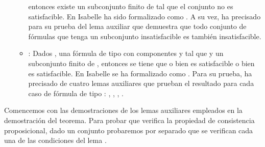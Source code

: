 \begin{isabellebody}
\begin{isamarkuptext}
\begin{itemize}
\begin{itemize}
      entonces existe un subconjunto finito  de  tal que el conjunto  no es 
      satisfacible. En Isabelle ha sido formalizado como . A su vez, ha precisado
      para su prueba del lema auxiliar  que demuestra que todo conjunto de 
      fórmulas que tenga un subconjunto insatisfacible es también insatisfacible.
      \item {}: Dados ,  una fórmula de tipo \isa{{\isasymbeta}} con componentes  y  
      tal que  y  un subconjunto finito de , entonces se tiene que o bien 
       es satisfacible o bien  es satisfacible. En Isabelle se ha
      formalizado como . Para su prueba, ha precisado de cuatro lemas
      auxiliares que prueban el resultado para cada caso de fórmula de tipo \isa{{\isasymbeta}}: 
      , , ,
      .
    \end{itemize}
  \end{itemize}

  Comencemos con las demostraciones de los lemas auxiliares empleados en la demostración del 
  teorema. Para probar que  verifica la propiedad de consistencia proposicional, dado un conjunto 
   probaremos por separado que se verifican cada una de las condiciones del lema .
  

\end{isamarkuptext}
\end{isabellebody}
